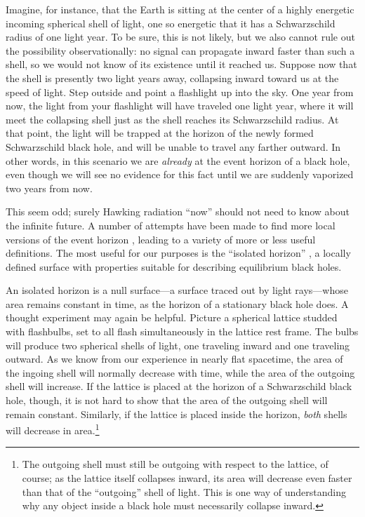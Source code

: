 \documentclass[12pt]{article}
\begin{document}
\begin{appendix}
Imagine, for instance, that the Earth is sitting at the center of a highly 
energetic incoming spherical shell of light, one so energetic that 
it has a Schwarzschild radius of one light year.  To be sure, this is 
not likely, but we also cannot rule out the possibility observationally:
no signal can propagate inward faster than such a shell, so we 
would not know of its existence until it reached us.  Suppose now
that the shell is presently two light years away, collapsing inward
toward us at the speed of light.  Step outside and point a flashlight 
up into the sky.  One year from now, the light from your flashlight
will have traveled one light year, where it will meet the collapsing 
shell just as the shell reaches its Schwarzschild radius.  At that 
point, the light will be trapped at the horizon of the newly formed
Schwarzschild black hole, and will be unable to travel any farther 
outward.  In other words, in this scenario we are \emph{already} at 
the event horizon of a black hole, even though we will see no
evidence for this fact until we are suddenly vaporized two years 
from now.

This seem odd; surely Hawking radiation ``now'' should not need to
know about the infinite future.  A number of attempts have been made 
to find more local versions of the event horizon \cite{Boothb},
leading to a variety of more or less useful definitions.  The 
most useful for our purposes is the ``isolated horizon'' \cite{Ashisol},
a locally defined surface with properties suitable for 
describing equilibrium black holes.  

An isolated horizon is a null surface---a surface traced out by light 
rays---whose area remains constant in time, as the horizon of a 
stationary black hole does.  A thought experiment may again be helpful.  
Picture a spherical lattice studded with flashbulbs, set to all flash 
simultaneously in the lattice rest frame.   The bulbs will produce two 
spherical shells of light, one traveling inward and one traveling outward.  
As we know from our experience in nearly flat spacetime, the area of
the ingoing shell will normally decrease with time, while the area 
of the outgoing shell will increase.  If the lattice is placed at the 
horizon of a Schwarzschild black hole, though, it is not hard to 
show that the area of the outgoing shell will remain constant.  
Similarly, if the lattice is placed inside the horizon, \emph{both} 
shells will decrease in area.\footnote{The outgoing shell must
still be outgoing with respect to the lattice, of course; as the lattice 
itself collapses inward, its area will decrease even faster than that 
of the ``outgoing'' shell of light.  This is one way of understanding 
why any object inside a black hole must necessarily collapse inward.}   


\end{appendix}
\end{document}
